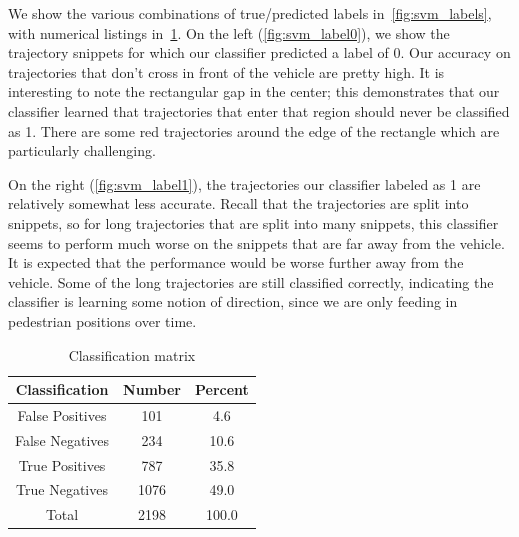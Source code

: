 We show the various combinations of true/predicted labels in~\cref{fig:svm_labels}, with numerical listings in~\cref{table_svm_outputs}.
On the left (\cref{fig:svm_label0}), we show the trajectory snippets for which our classifier predicted a label of 0.
Our accuracy on trajectories that don't cross in front of the vehicle are pretty high.
It is interesting to note the rectangular gap in the center; this demonstrates that our classifier learned that trajectories that enter that region should never be classified as 1.
There are some red trajectories around the edge of the rectangle which are particularly challenging. 

On the right (\cref{fig:svm_label1}), the trajectories our classifier labeled as 1 are relatively somewhat less accurate.
Recall that the trajectories are split into snippets, so for long trajectories that are split into many snippets, this classifier seems to perform much worse on the snippets that are far away from the vehicle.
It is expected that the performance would be worse further away from the vehicle.
Some of the long trajectories are still classified correctly, indicating the classifier is learning some notion of direction, since we are only feeding in pedestrian positions over time.

\begin{table}[ht!]
\centering
\begin{tabular}{||c||c c||}  
 \hline
 Classification & Number & Percent \\
 \hline\hline
 False Positives & 101 & 4.6 \\ \hline
 False Negatives & 234 & 10.6 \\ \hline
 True Positives & 787 & 35.8 \\ \hline
 True Negatives & 1076 & 49.0 \\ \hline\hline
 Total & 2198 & 100.0\\ \hline
\end{tabular}
\caption{Classification matrix}
\label{table_svm_outputs}
\end{table}

